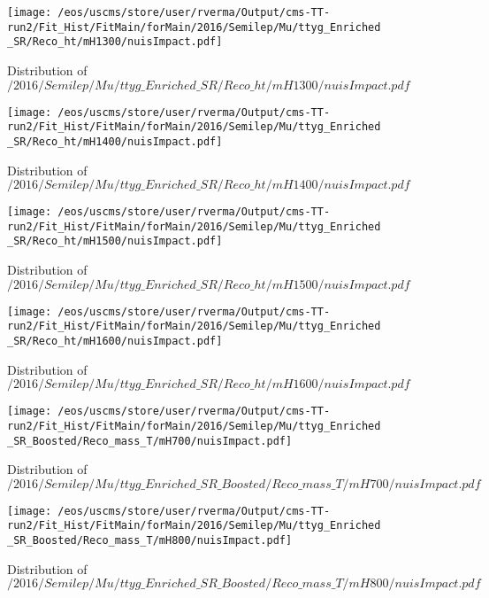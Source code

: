 \begin{figure}
\centering
\texttt{[image: /eos/uscms/store/user/rverma/Output/cms-TT-run2/Fit\_Hist/FitMain/forMain/2016/Semilep/Mu/ttyg\_Enriched\_SR/Reco\_ht/mH1300/nuisImpact.pdf]}
\caption{Distribution of $/2016/Semilep/Mu/ttyg\_Enriched\_SR/Reco\_ht/mH1300/nuisImpact.pdf$}
\end{figure}

\begin{figure}
\centering
\texttt{[image: /eos/uscms/store/user/rverma/Output/cms-TT-run2/Fit\_Hist/FitMain/forMain/2016/Semilep/Mu/ttyg\_Enriched\_SR/Reco\_ht/mH1400/nuisImpact.pdf]}
\caption{Distribution of $/2016/Semilep/Mu/ttyg\_Enriched\_SR/Reco\_ht/mH1400/nuisImpact.pdf$}
\end{figure}

\begin{figure}
\centering
\texttt{[image: /eos/uscms/store/user/rverma/Output/cms-TT-run2/Fit\_Hist/FitMain/forMain/2016/Semilep/Mu/ttyg\_Enriched\_SR/Reco\_ht/mH1500/nuisImpact.pdf]}
\caption{Distribution of $/2016/Semilep/Mu/ttyg\_Enriched\_SR/Reco\_ht/mH1500/nuisImpact.pdf$}
\end{figure}

\begin{figure}
\centering
\texttt{[image: /eos/uscms/store/user/rverma/Output/cms-TT-run2/Fit\_Hist/FitMain/forMain/2016/Semilep/Mu/ttyg\_Enriched\_SR/Reco\_ht/mH1600/nuisImpact.pdf]}
\caption{Distribution of $/2016/Semilep/Mu/ttyg\_Enriched\_SR/Reco\_ht/mH1600/nuisImpact.pdf$}
\end{figure}

\begin{figure}
\centering
\texttt{[image: /eos/uscms/store/user/rverma/Output/cms-TT-run2/Fit\_Hist/FitMain/forMain/2016/Semilep/Mu/ttyg\_Enriched\_SR\_Boosted/Reco\_mass\_T/mH700/nuisImpact.pdf]}
\caption{Distribution of $/2016/Semilep/Mu/ttyg\_Enriched\_SR\_Boosted/Reco\_mass\_T/mH700/nuisImpact.pdf$}
\end{figure}

\begin{figure}
\centering
\texttt{[image: /eos/uscms/store/user/rverma/Output/cms-TT-run2/Fit\_Hist/FitMain/forMain/2016/Semilep/Mu/ttyg\_Enriched\_SR\_Boosted/Reco\_mass\_T/mH800/nuisImpact.pdf]}
\caption{Distribution of $/2016/Semilep/Mu/ttyg\_Enriched\_SR\_Boosted/Reco\_mass\_T/mH800/nuisImpact.pdf$}
\end{figure}


